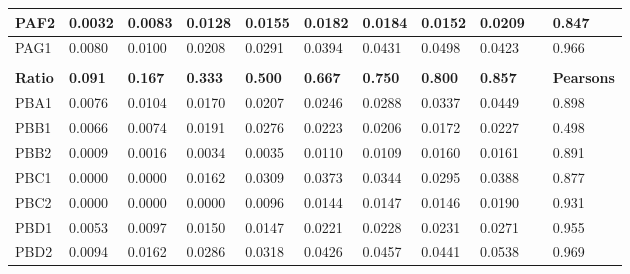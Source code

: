 \begin{tabular}{|l|l|l|l|l|l|l|l|l|l|l|}
PAF2           & 0.0032         & 0.0083         & 0.0128         & 0.0155         & 0.0182         & 0.0184         & 0.0152         & 0.0209         &                  & 0.847             \\ \hline
PAG1           & 0.0080         & 0.0100         & 0.0208         & 0.0291         & 0.0394         & 0.0431         & 0.0498         & 0.0423         &                  & 0.966             \\ \hline
               &                &                &                &                &                &                &                &                &                  &                   \\ \hline
\textbf{Ratio} & \textbf{0.091} & \textbf{0.167} & \textbf{0.333} & \textbf{0.500} & \textbf{0.667} & \textbf{0.750} & \textbf{0.800} & \textbf{0.857} &                  & \textbf{Pearsons} \\ \hline
PBA1           & 0.0076         & 0.0104         & 0.0170         & 0.0207         & 0.0246         & 0.0288         & 0.0337         & 0.0449         &                  & 0.898             \\ \hline
PBB1           & 0.0066         & 0.0074         & 0.0191         & 0.0276         & 0.0223         & 0.0206         & 0.0172         & 0.0227         &                  & 0.498             \\ \hline
PBB2           & 0.0009         & 0.0016         & 0.0034         & 0.0035         & 0.0110         & 0.0109         & 0.0160         & 0.0161         &                  & 0.891             \\ \hline
PBC1           & 0.0000         & 0.0000         & 0.0162         & 0.0309         & 0.0373         & 0.0344         & 0.0295         & 0.0388         &                  & 0.877             \\ \hline
PBC2           & 0.0000         & 0.0000         & 0.0000         & 0.0096         & 0.0144         & 0.0147         & 0.0146         & 0.0190         &                  & 0.931             \\ \hline
PBD1           & 0.0053         & 0.0097         & 0.0150         & 0.0147         & 0.0221         & 0.0228         & 0.0231         & 0.0271         &                  & 0.955             \\ \hline
PBD2           & 0.0094         & 0.0162         & 0.0286         & 0.0318         & 0.0426         & 0.0457         & 0.0441         & 0.0538         &                  & 0.969             \\ \hline

\end{tabular}
